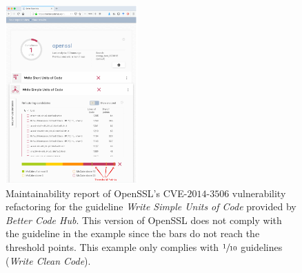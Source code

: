 \documentclass[sigconf,review]{acmart}
\begin{document}
\begin{figure}[h]
 	\centering 	\includegraphics[width=0.45\textwidth]{figures/bch_report.png}
 	\caption{Maintainability report of OpenSSL's CVE-$2014$-$3506$ vulnerability
refactoring for the guideline \emph{Write Simple Units of Code} provided by
\emph{Better Code Hub}. This version of OpenSSL does not comply with the
guideline in the example since the bars do not reach the threshold points. This
example only complies with $\sfrac{1}{10}$ guidelines (\emph{Write Clean Code}).}
	\label{fig:bchrep}
\end{figure}
\end{document}
